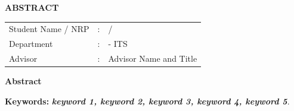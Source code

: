 {\parskip=0pt\centering\large\textbf{ABSTRACT}\par}

\vspace{3ex}

{\parskip=0pt\centering\textbf{\engtatitle{}}\par}
\vspace{\baselineskip}

\begingroup
\setlength{\tabcolsep}{0pt}

\bfseries
\begin{tabularx}{\textwidth}{l >{\centering}m{2em} X}
  Student Name / NRP & : & \name{} / \nrp{} \\[1ex]
  Department         & : & \engdepartment{} \engfacultyshort{} - ITS \\[1ex]
  Advisor            & : & Advisor Name and Title \\
\end{tabularx}
\endgroup
\vspace{\baselineskip}

\paragraphtextstyle

\noindent\textbf{Abstract}

\lipsum[1]

\vspace{\baselineskip}

\noindent\textbf{Keywords:} \textbf{\textit{keyword 1, keyword 2, keyword 3, keyword 4, keyword 5}}.

